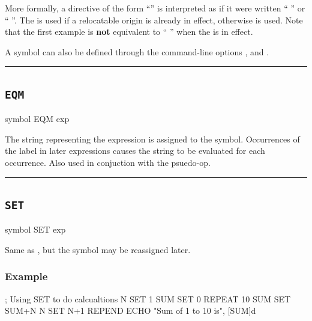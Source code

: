More formally, a directive of the form ``'' is
interpreted as if it were written `` '' or  `` ''.
The  is used if a relocatable origin is already in effect,
otherwise  is used. Note that the first example is \textbf{not}
equivalent to `` '' when the  is in effect.

A symbol can also be defined through the command-line options ,  and .\\

\hrule
\subsection{\texttt{EQM}}
\label{pseudoop:eqm}

\begin{usage}
symbol EQM exp
\end{usage}

The string representing the expression is assigned to the
symbol.  Occurrences of the label in later expressions causes
the string to be evaluated for each occurrence.  Also used in
conjuction with the  psuedo-op.\\

\hrule
\subsection{\texttt{SET}}
\label{pseudoop:set}

\begin{usage}
symbol SET exp
\end{usage}


Same as , but the symbol may be reassigned later.\\

\subsubsection{Example}

\begin{code}
; Using SET to do calcualtions
N SET 1 
SUM SET 0
  REPEAT 10
SUM SET SUM+N
N SET N+1
  REPEND
  ECHO "Sum of 1 to 10 is", [SUM]d
\end{code}

